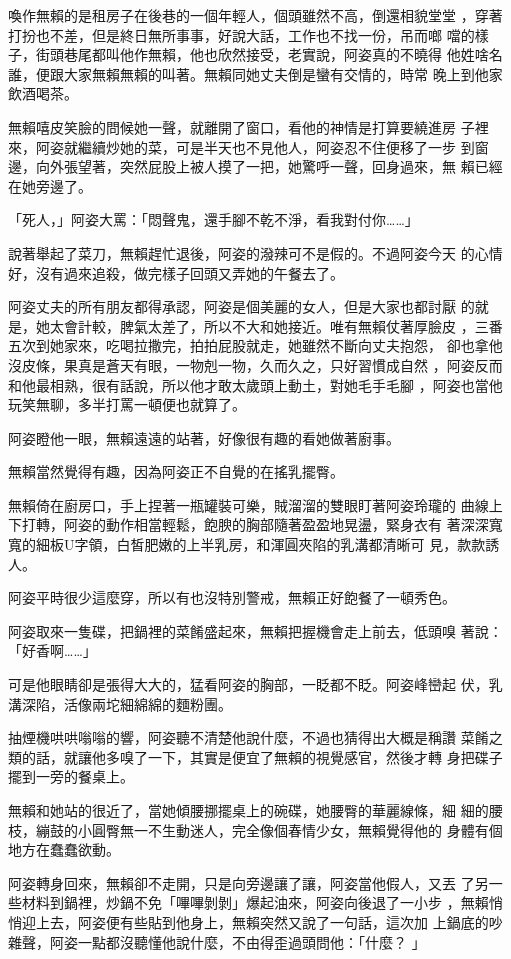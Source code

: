 喚作無賴的是租房子在後巷的一個年輕人，個頭雖然不高，倒還相貌堂堂
，穿著打扮也不差，但是終日無所事事，好說大話，工作也不找一份，吊而啷
噹的樣子，街頭巷尾都叫他作無賴，他也欣然接受，老實說，阿姿真的不曉得
他姓啥名誰，便跟大家無賴無賴的叫著。無賴同她丈夫倒是蠻有交情的，時常
晚上到他家飲酒喝茶。

無賴嘻皮笑臉的問候她一聲，就離開了窗口，看他的神情是打算要繞進房
子裡來，阿姿就繼續炒她的菜，可是半天也不見他人，阿姿忍不住便移了一步
到窗邊，向外張望著，突然屁股上被人摸了一把，她驚呼一聲，回身過來，無
賴已經在她旁邊了。

「死人，」阿姿大罵：「悶聲鬼，還手腳不乾不淨，看我對付你……」

說著舉起了菜刀，無賴趕忙退後，阿姿的潑辣可不是假的。不過阿姿今天
的心情好，沒有過來追殺，做完樣子回頭又弄她的午餐去了。

阿姿丈夫的所有朋友都得承認，阿姿是個美麗的女人，但是大家也都討厭
的就是，她太會計較，脾氣太差了，所以不大和她接近。唯有無賴仗著厚臉皮
，三番五次到她家來，吃喝拉撒完，拍拍屁股就走，她雖然不斷向丈夫抱怨，
卻也拿他沒皮條，果真是蒼天有眼，一物剋一物，久而久之，只好習慣成自然
，阿姿反而和他最相熟，很有話說，所以他才敢太歲頭上動土，對她毛手毛腳
，阿姿也當他玩笑無聊，多半打罵一頓便也就算了。

阿姿瞪他一眼，無賴遠遠的站著，好像很有趣的看她做著廚事。

無賴當然覺得有趣，因為阿姿正不自覺的在搖乳擺臀。

無賴倚在廚房口，手上捏著一瓶罐裝可樂，賊溜溜的雙眼盯著阿姿玲瓏的
曲線上下打轉，阿姿的動作相當輕鬆，飽腴的胸部隨著盈盈地晃盪，緊身衣有
著深深寬寬的細板U字領，白皙肥嫩的上半乳房，和渾圓夾陷的乳溝都清晰可
見，款款誘人。

阿姿平時很少這麼穿，所以有也沒特別警戒，無賴正好飽餐了一頓秀色。

阿姿取來一隻碟，把鍋裡的菜餚盛起來，無賴把握機會走上前去，低頭嗅
著說：「好香啊……」

可是他眼睛卻是張得大大的，猛看阿姿的胸部，一眨都不眨。阿姿峰巒起
伏，乳溝深陷，活像兩坨細綿綿的麵粉團。

抽煙機哄哄嗡嗡的響，阿姿聽不清楚他說什麼，不過也猜得出大概是稱讚
菜餚之類的話，就讓他多嗅了一下，其實是便宜了無賴的視覺感官，然後才轉
身把碟子擺到一旁的餐桌上。

無賴和她站的很近了，當她傾腰挪擺桌上的碗碟，她腰臀的華麗線條，細
細的腰枝，繃鼓的小圓臀無一不生動迷人，完全像個春情少女，無賴覺得他的
身體有個地方在蠢蠢欲動。

阿姿轉身回來，無賴卻不走開，只是向旁邊讓了讓，阿姿當他假人，又丟
了另一些材料到鍋裡，炒鍋不免「嗶嗶剝剝」爆起油來，阿姿向後退了一小步
，無賴悄悄迎上去，阿姿便有些貼到他身上，無賴突然又說了一句話，這次加
上鍋底的吵雜聲，阿姿一點都沒聽懂他說什麼，不由得歪過頭問他：「什麼？
」

